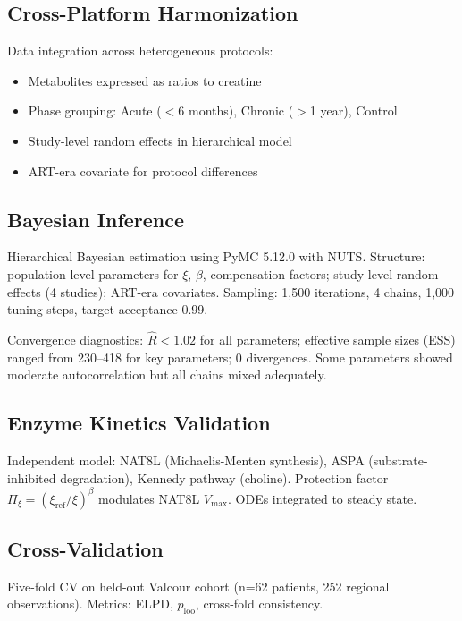 \documentclass[10pt,a4paper]{article}
\begin{document}
\subsection{Cross-Platform Harmonization}

Data integration across heterogeneous protocols:
\begin{itemize}
\item Metabolites expressed as ratios to creatine
\item Phase grouping: Acute ($<$6 months), Chronic ($>$1 year), Control
\item Study-level random effects in hierarchical model
\item ART-era covariate for protocol differences
\end{itemize}

\subsection{Bayesian Inference}

Hierarchical Bayesian estimation using PyMC 5.12.0\cite{abril2023} with NUTS\cite{hoffman2014}. Structure: population-level parameters for $\xi$, $\beta$, compensation factors; study-level random effects (4 studies); ART-era covariates. Sampling: 1,500 iterations, 4 chains, 1,000 tuning steps, target acceptance 0.99.

Convergence diagnostics: $\hat{R} < 1.02$ for all parameters; effective sample sizes (ESS) ranged from 230--418 for key parameters; 0 divergences. Some parameters showed moderate autocorrelation but all chains mixed adequately.

\subsection{Enzyme Kinetics Validation}

Independent model: NAT8L (Michaelis-Menten synthesis), ASPA (substrate-inhibited degradation), Kennedy pathway (choline). Protection factor $\Pi_\xi = (\xi_{\text{ref}}/\xi)^\beta$ modulates NAT8L $V_{\text{max}}$. ODEs integrated to steady state.

\subsection{Cross-Validation}

Five-fold CV on held-out Valcour cohort (n=62 patients, 252 regional observations). Metrics: ELPD, $p_{\text{loo}}$, cross-fold consistency.
\end{document}
